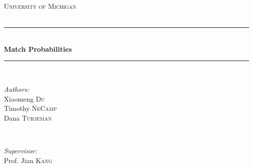 \begin{titlepage}

\newcommand{\HRule}{\rule{\linewidth}{0.5mm}} %

\center %
 

\textsc{\LARGE University of Michigan}\\[1.5cm] %
\textsc{}\\[0.5cm] %



\HRule \\[0.4cm]
{ \huge \bfseries Match Probabilities}\\[0.4cm] %
\HRule \\[1.5cm]
 

\begin{minipage}{0.4\textwidth}
\begin{flushleft} \large
\emph{Authors:}\\
Xiaomeng \textsc{Du} %
\\
Timothy \textsc{NeCamp} %
\\
Dana \textsc{Turjeman} %
\end{flushleft}
\end{minipage}
~
\begin{minipage}{0.4\textwidth}
\begin{flushright} \large
\emph{Supervisor:} \\
Prof. Jian \textsc{Kang} %
\end{flushright}
\end{minipage}\\[2cm]



\end{titlepage}
